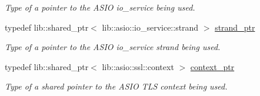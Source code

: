\begin{DoxyCompactItemize}
\begin{DoxyCompactList}\small\item\em Type of a pointer to the A\+S\+I\+O io\+\_\+service being used. \end{DoxyCompactList}\item 
typedef lib\+::shared\+\_\+ptr$<$ lib\+::asio\+::io\+\_\+service\+::strand $>$ \hyperlink{classwebsocketpp_1_1transport_1_1asio_1_1tls__socket_1_1connection_aea9f37f95a42ad1a82a4ff0d7977ae37}{strand\+\_\+ptr}
\begin{DoxyCompactList}\small\item\em Type of a pointer to the A\+S\+I\+O io\+\_\+service strand being used. \end{DoxyCompactList}\item 
typedef lib\+::shared\+\_\+ptr$<$ lib\+::asio\+::ssl\+::context $>$ \hyperlink{classwebsocketpp_1_1transport_1_1asio_1_1tls__socket_1_1connection_a268bd7f4a04d78004247d6d8d769b841}{context\+\_\+ptr}
\begin{DoxyCompactList}\small\item\em Type of a shared pointer to the A\+S\+I\+O T\+L\+S context being used. \end{DoxyCompactList}\end{DoxyCompactItemize}
